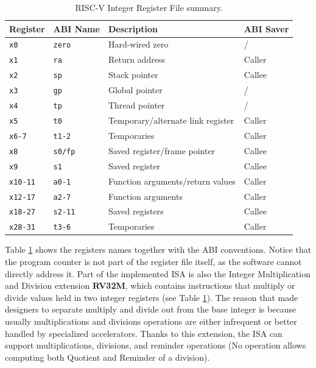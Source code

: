 \begin{table}
\centering
\begin{tabular}{| p{1.5cm} | p{1cm} | p{3.5cm} | p{2cm} |}
    \hline
    \textbf{Register} & \textbf{ABI Name} & \textbf{Description} & \textbf{ABI Saver}\\ \hline
    \texttt{x0} & \texttt{zero} & Hard-wired zero & / \\ \hline
    \texttt{x1} & \texttt{ra} & Return address & Caller \\ \hline
    \texttt{x2} & \texttt{sp} & Stack pointer & Callee \\ \hline
    \texttt{x3} & \texttt{gp} & Global pointer & / \\ \hline
    \texttt{x4} & \texttt{tp} & Thread pointer & / \\ \hline
    \texttt{x5} & \texttt{t0} & Temporary/alternate link register & Caller \\ \hline
    \texttt{x6-7} & \texttt{t1-2} & Temporaries & Caller \\ \hline
    \texttt{x8} & \texttt{s0/fp} & Saved register/frame pointer & Callee \\ \hline
    \texttt{x9} & \texttt{s1} & Saved register & Callee \\ \hline
    \texttt{x10-11} & \texttt{a0-1} & Function arguments/return values & Caller \\ \hline
    \texttt{x12-17} & \texttt{a2-7} & Function arguments & Caller \\ \hline
    \texttt{x18-27} & \texttt{s2-11} & Saved registers & Callee \\ \hline
    \texttt{x28-31} & \texttt{t3-6} & Temporaries & Caller \\ \hline
    \hline
\end{tabular}
\caption{RISC-V Integer Register File summary.}
\label{tab:iregfile} %
\end{table}
Table \ref{tab:iregfile} shows the registers names together with the ABI conventions. Notice that the program counter is not part of the register file itself, as the software cannot directly address it.\vspace{5mm} \newline
Part of the implemented ISA is also the Integer Multiplication and Division extension \textbf{RV32M}, which contains instructions that multiply or divide values held in two integer registers (see Table \ref{tab:iregfile}). The reason that made designers to separate multiply and divide out from the base integer is because usually multiplications and divisions operations are either infrequent or better handled by specialized accelerators. Thanks to this extension, the ISA can support multiplications, divisions, and reminder operations (No operation allows computing both Quotient and Reminder of a division).\vspace{5mm} \newline
